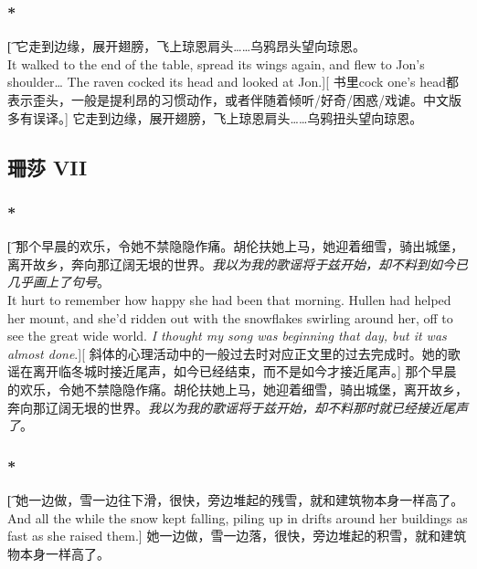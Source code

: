 \documentclass[12pt,a4paper]{article}
\begin{document}
\subsubsection{\color{red}*}\t[	
	它走到边缘，展开翅膀，飞上琼恩肩头……乌鸦昂头望向琼恩。\\
	It walked to the end of the table, spread its wings again, and flew to Jon's shoulder\ldots
	The raven cocked its head and looked at Jon.][
	书里cock one's head都表示歪头，一般是提利昂的习惯动作，或者伴随着倾听/好奇/困惑/戏谑。中文版多有误译。]
	它走到边缘，展开翅膀，飞上琼恩肩头……乌鸦扭头望向琼恩。	
	
\subsection{珊莎 VII}
\subsubsection{\color{red}*}\t[
	那个早晨的欢乐，令她不禁隐隐作痛。胡伦扶她上马，她迎着细雪，骑出城堡，离开故乡，奔向那辽阔无垠的世界。\emph{我以为我的歌谣将于兹开始，却不料到如今已几乎画上了句号}。\\
	It hurt to remember how happy she had been that morning. Hullen had helped her mount, and she'd ridden out with the snowflakes swirling around her, off to see the great wide world. \emph{I thought my song was beginning that day, but it was almost done}.][
	斜体的心理活动中的一般过去时对应正文里的过去完成时。她的歌谣在离开临冬城时接近尾声，如今已经结束，而不是如今才接近尾声。]
	那个早晨的欢乐，令她不禁隐隐作痛。胡伦扶她上马，她迎着细雪，骑出城堡，离开故乡，奔向那辽阔无垠的世界。\emph{我以为我的歌谣将于兹开始，却不料那时就已经接近尾声了}。
	
\subsubsection{\color{red}*}\t[
	 她一边做，雪一边往下滑，很快，旁边堆起的残雪，就和建筑物本身一样高了。\\
	 And all the while the snow kept falling, piling up in drifts around her buildings as fast as she raised them.]
	 她一边做，雪一边落，很快，旁边堆起的积雪，就和建筑物本身一样高了。
	 
\end{document}

